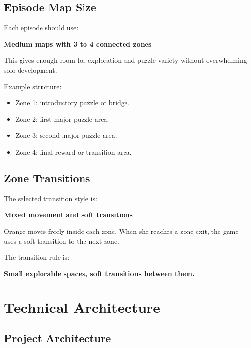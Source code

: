 \documentclass[12pt]{article}
\begin{document}
\subsection{Episode Map Size}

Each episode should use:

\begin{center}
\textbf{Medium maps with 3 to 4 connected zones}
\end{center}

This gives enough room for exploration and puzzle variety without overwhelming solo development.

Example structure:

\begin{itemize}[leftmargin=*]
    \item Zone 1: introductory puzzle or bridge.
    \item Zone 2: first major puzzle area.
    \item Zone 3: second major puzzle area.
    \item Zone 4: final reward or transition area.
\end{itemize}

\subsection{Zone Transitions}

The selected transition style is:

\begin{center}
\textbf{Mixed movement and soft transitions}
\end{center}

Orange moves freely inside each zone. When she reaches a zone exit, the game uses a soft transition to the next zone.

The transition rule is:

\begin{center}
\textbf{Small explorable spaces, soft transitions between them.}
\end{center}

\section{Technical Architecture}

\subsection{Project Architecture}
\end{document}
